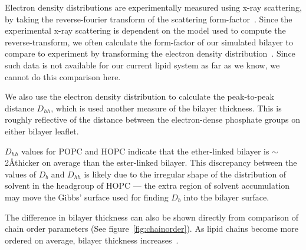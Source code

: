 \documentclass[12pt,openany,final]{book}
\newcommand{\about}{$\sim$}
\begin{document}
Electron density distributions are experimentally measured using x-ray scattering, by taking the reverse-fourier transform of
the scattering form-factor~\cite{fogarty:2015,nagle:2000,pandit:2008:simulationtextbook}. Since the experimental x-ray scattering is dependent on the model used to
compute the reverse-transform, we often calculate the form-factor of our simulated bilayer to compare to experiment by transforming the
electron density distribution~\cite{chiu:2009,kruczek:2017:ether,kruczek:2017}.
Since such data is not available for our current lipid system as far as we know, we cannot do this comparison here. 

We also use the electron density distribution to calculate the peak-to-peak distance $D_{hh}$, 
which is used another measure of the bilayer thickness. This is roughly reflective of the distance between the 
electron-dense phosphate groups on either bilayer leaflet.

$D_{hh}$ values for POPC and HOPC indicate that the ether-linked bilayer is \about2\AA thicker on average than the ester-linked bilayer. 
This discrepancy between the values of $D_b$ and $D_{hh}$ is likely due to the irregular shape of the 
distribution of solvent in the headgroup of HOPC --- the extra region 
of solvent accumulation may move the Gibbs' surface used for finding $D_b$ into the bilayer surface.

The difference in bilayer thickness can also be shown directly from comparison of chain order 
parameters (See figure~\ref{fig:chainorder}). As lipid chains become more ordered on average, bilayer thickness
increases~\cite{nagle:2000}.
\end{document}
